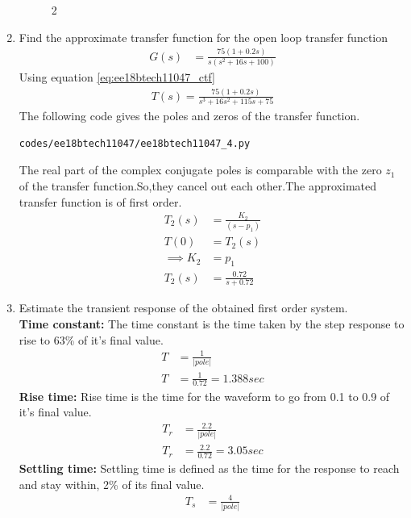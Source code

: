\begin{enumerate}[label=\thesubsection.\arabic*.,ref=\thesubsection.\theenumi]
\begin{figure}[!ht]
\caption{2}
\label{fig:ee18btech11047_3}
\end{figure}
\item Find the approximate transfer function for the open loop transfer function
\begin{align}
G(s) &= \frac{75(1+0.2s)}{s(s^{2}+16s+100)}
\end{align}
\solution Using equation \eqref{eq:ee18btech11047_ctf}
\begin{align}
T(s) = \frac{75(1+0.2s)}{s^3 + 16s^2 + 115s +75} 
\end{align}
The following code gives the poles and zeros of the transfer function.
\begin{lstlisting}
codes/ee18btech11047/ee18btech11047_4.py
\end{lstlisting}
\begin{table}[!ht]
\centering

\caption{}
\label{table:ee18btech11047_2}
\end{table}
The real part of the complex conjugate poles is comparable with the zero $z_{1}$ of the transfer function.So,they cancel out each other.The approximated transfer function is of first order.
\begin{align}
T_{2}(s) &= \frac{K_{2}}{(s-p_{1})}\\
T(0) &= T_{2}(s)\\
\implies K_{2} &= p_{1} \\
T_{2}(s) &= \frac{0.72}{s+0.72}
\end{align}
\item Estimate the transient response of the obtained first order system.\\
\solution
\textbf{Time constant:}
The time constant is the time taken by the step response to rise to 63\% of it's final value.
\begin{align}
T &= \frac{1}{|pole|}\\
T &= \frac{1}{0.72} = 1.388 sec
\end{align}
\textbf{Rise time:}
Rise time is the time for the waveform to go from 0.1 to 0.9 of it's final value.
\begin{align}
T_{r} &= \frac{2.2}{|pole|}\\
T_{r} &= \frac{2.2}{0.72} = 3.05 sec
\end{align}
\textbf{Settling time:}
Settling time is defined as the time for the response to reach and stay within, 2\% of its final value.
\begin{align}
T_{s} &= \frac{4}{|pole|}\\

\end{align}
\end{enumerate}
